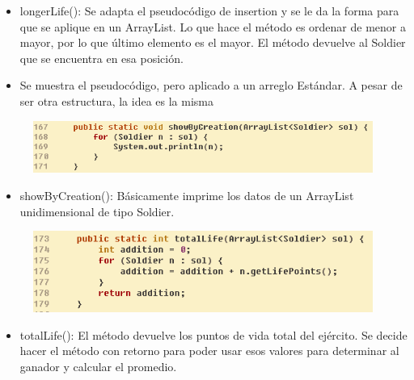 \documentclass{article}
\begin{document}
	
	\begin{itemize}	
		\item longerLife(): Se adapta el pseudocódigo de insertion y se le da la forma para que se aplique en un ArrayList. Lo que hace el método es ordenar de menor a mayor, por lo que último elemento es el mayor. El método devuelve al Soldier que se encuentra en esa posición.
		\item Se muestra el pseudocódigo, pero aplicado a un arreglo Estándar. A pesar de ser otra estructura, la idea es la misma
	\end{itemize}
		
		
	\begin{figure}[H]
		\centering
		\includegraphics[width=0.99\textwidth,keepaspectratio]{img/showByCreation.png}
	\end{figure}
	
	\begin{itemize}	
		\item showByCreation(): Básicamente imprime los datos de un ArrayList unidimensional de tipo Soldier.
	\end{itemize}
	
	\begin{figure}[H]
		\centering
		\includegraphics[width=0.99\textwidth,keepaspectratio]{img/totalLife.png}
	\end{figure}	
	
	
	\begin{itemize}	
		\item totalLife(): El método devuelve los puntos de vida total del ejército. Se decide hacer el método con retorno para poder usar esos valores para determinar al ganador y calcular el promedio.
	\end{itemize}
		
		
		
\end{document}
